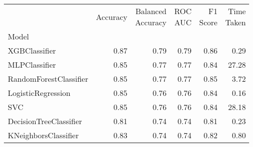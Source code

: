 \begin{tabular}{lrrrrr}
\toprule
{} &  Accuracy &  Balanced Accuracy &  ROC AUC &  F1 Score &  Time Taken \\
Model                  &           &                    &          &           &             \\
\midrule
XGBClassifier          &      0.87 &               0.79 &     0.79 &      0.86 &        0.29 \\
MLPClassifier          &      0.85 &               0.77 &     0.77 &      0.84 &       27.28 \\
RandomForestClassifier &      0.85 &               0.77 &     0.77 &      0.85 &        3.72 \\
LogisticRegression     &      0.85 &               0.76 &     0.76 &      0.84 &        0.16 \\
SVC                    &      0.85 &               0.76 &     0.76 &      0.84 &       28.18 \\
DecisionTreeClassifier &      0.81 &               0.74 &     0.74 &      0.81 &        0.23 \\
KNeighborsClassifier   &      0.83 &               0.74 &     0.74 &      0.82 &        0.80 \\
\bottomrule
\end{tabular}
